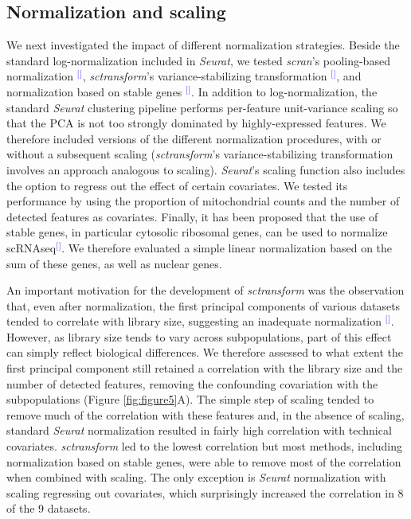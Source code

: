 \documentclass[11pt]{article}
\renewcommand{\cite}[1]{\textcolor{Blue}{$^[$\supercite{#1}$^]$}}
\begin{document}
\subsection*{Normalization and scaling}

We next investigated the impact of different normalization strategies. Beside the standard log-normalization included in \textit{Seurat}, we tested \textit{scran}'s pooling-based normalization \cite{lunPooling2016}, \textit{sctransform}'s variance-stabilizing transformation \cite{hafemeisterSCtransform2019}, and normalization based on stable genes \cite{linStableGenes2018, deekeStablyExpressed2018}. 
In addition to log-normalization, the standard \textit{Seurat} clustering pipeline performs per-feature unit-variance scaling so that the PCA is not too strongly dominated by highly-expressed features. We therefore included versions of the different normalization procedures, with or without a subsequent scaling (\textit{sctransform}'s variance-stabilizing transformation involves an approach analogous to scaling). 
\textit{Seurat}'s scaling function also includes the option to regress out the effect of certain covariates. We tested its performance by using the proportion of mitochondrial counts and the number of detected features as covariates. Finally, it has been proposed that the use of stable genes, in particular cytosolic ribosomal genes, can be used to normalize scRNAseq\cite{deekeStablyExpressed2018}. We therefore evaluated a simple linear normalization based on the sum of these genes, as well as nuclear genes.

An important motivation for the development of \textit{sctransform} was the observation that, even after normalization, the first principal components of various datasets tended to correlate with library size, suggesting an inadequate normalization \cite{hafemeisterSCtransform2019}. However, as library size tends to vary across subpopulations, part of this effect can simply reflect biological differences. We therefore assessed to what extent the first principal component still retained a correlation with the library size and the number of detected features, removing the confounding covariation with the subpopulations (Figure \ref{fig:figure5}A). The simple step of scaling tended to remove much of the correlation with these features and, in the absence of scaling, standard \textit{Seurat} normalization resulted in fairly high correlation with technical covariates. \textit{sctransform} led to the lowest correlation but most methods, including normalization based on stable genes, were able to remove most of the correlation when combined with scaling. The only exception is \textit{Seurat} normalization with scaling regressing out covariates, which surprisingly increased the correlation in 8 of the 9 datasets.
\end{document}
